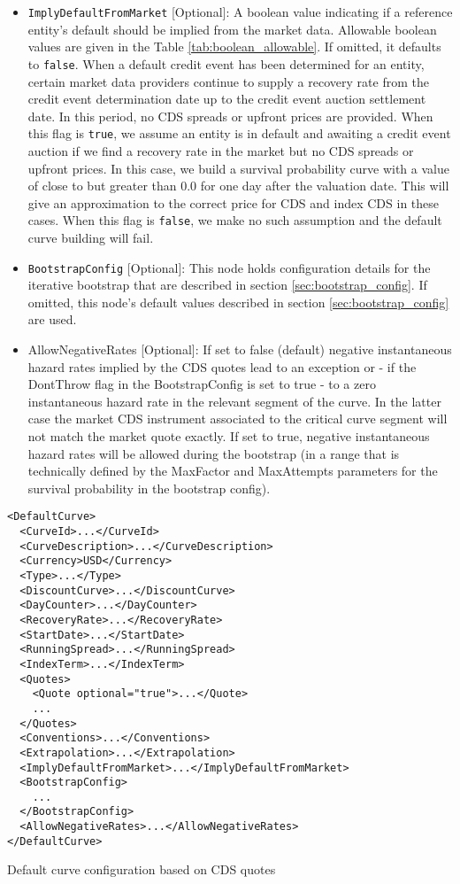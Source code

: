 \begin{itemize}
\item \lstinline!ImplyDefaultFromMarket! [Optional]:
A boolean value indicating if a reference entity's default should be implied from the market data. Allowable boolean values are given in the Table \ref{tab:boolean_allowable}. If omitted, it defaults to \lstinline!false!. When a default credit event has been determined for an entity, certain market data providers continue to supply a recovery rate from the credit event determination date up to the credit event auction settlement date. In this period, no CDS spreads or upfront prices are provided. When this flag is \lstinline!true!, we assume an entity is in default and awaiting a credit event auction if we find a recovery rate in the market but no CDS spreads or upfront prices. In this case, we build a survival probability curve with a value of close to but greater than 0.0 for one day after the valuation date. This will give an approximation to the correct price for CDS and index CDS in these cases. When this flag is \lstinline!false!, we make no such assumption and the default curve building will fail.

\item \lstinline!BootstrapConfig! [Optional]:
This node holds configuration details for the iterative bootstrap that are described in section \ref{sec:bootstrap_config}. If omitted, this node's default values described in section \ref{sec:bootstrap_config} are used.

\item AllowNegativeRates [Optional]: If set to false (default) negative instantaneous hazard rates implied by the CDS
  quotes lead to an exception or - if the DontThrow flag in the BootstrapConfig is set to true - to a zero instantaneous
  hazard rate in the relevant segment of the curve. In the latter case the market CDS instrument associated to the
  critical curve segment will not match the market quote exactly. If set to true, negative instantaneous hazard rates
  will be allowed during the bootstrap (in a range that is technically defined by the MaxFactor and MaxAttempts
  parameters for the survival probability in the bootstrap config).

\end{itemize}

\begin{longlisting}
\begin{verbatim}
<DefaultCurve>
  <CurveId>...</CurveId>
  <CurveDescription>...</CurveDescription>
  <Currency>USD</Currency> 
  <Type>...</Type>
  <DiscountCurve>...</DiscountCurve>
  <DayCounter>...</DayCounter>
  <RecoveryRate>...</RecoveryRate>
  <StartDate>...</StartDate>
  <RunningSpread>...</RunningSpread>
  <IndexTerm>...</IndexTerm>
  <Quotes>
    <Quote optional="true">...</Quote>
    ...
  </Quotes>
  <Conventions>...</Conventions>
  <Extrapolation>...</Extrapolation>
  <ImplyDefaultFromMarket>...</ImplyDefaultFromMarket>
  <BootstrapConfig>
    ...
  </BootstrapConfig>
  <AllowNegativeRates>...</AllowNegativeRates>
</DefaultCurve>
\end{verbatim}
\caption{Default curve configuration based on CDS quotes}
\label{lst:defaultcurve_cds_configuration}
\end{longlisting}
